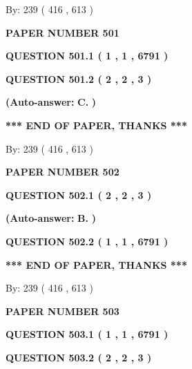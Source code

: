 \documentclass[12pt]{article}
\begin{document}
   
\hspace{1.0in} By: 
 239 ( 416 ,  613 )
   
   
   
   
\newpage 
\setcounter{page}{ 
   501001 } 
   
   
 {\textbf{ \Large{ PAPER NUMBER  501  }}}
   
   
   
   
  
  
{\textbf{\large{QUESTION
501.1 
 ( 1 , 1 , 6791 )
}}}
  
  
{\textbf{\large{QUESTION
501.2 
 ( 2 , 2 , 3 )
}}}
 
 
{\textbf{(Auto-answer:}}
{\textbf{\large{
C.}}}
{\textbf{)}}
 
 
   
   
   
   
\vspace{1.0in} 
{\textbf{\large{ *** END OF PAPER, THANKS *** }}} 
   
   
\hspace{1.0in} By: 
 239 ( 416 ,  613 )
   
   
   
   
\newpage 
\setcounter{page}{ 
   502001 } 
   
   
 {\textbf{ \Large{ PAPER NUMBER  502  }}}
   
   
   
   
  
  
{\textbf{\large{QUESTION
502.1 
 ( 2 , 2 , 3 )
}}}
 
 
{\textbf{(Auto-answer:}}
{\textbf{\large{
B.}}}
{\textbf{)}}
 
 
  
  
{\textbf{\large{QUESTION
502.2 
 ( 1 , 1 , 6791 )
}}}
   
   
   
   
\vspace{1.0in} 
{\textbf{\large{ *** END OF PAPER, THANKS *** }}} 
   
   
\hspace{1.0in} By: 
 239 ( 416 ,  613 )
   
   
   
   
\newpage 
\setcounter{page}{ 
   503001 } 
   
   
 {\textbf{ \Large{ PAPER NUMBER  503  }}}
   
   
   
   
  
  
{\textbf{\large{QUESTION
503.1 
 ( 1 , 1 , 6791 )
}}}
  
  
{\textbf{\large{QUESTION
503.2 
 ( 2 , 2 , 3 )
}}}
 
\end{document}

